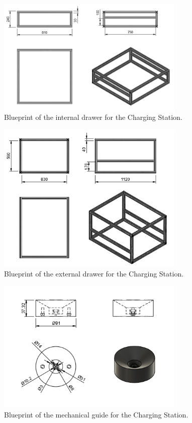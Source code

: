 

\begin{figure}[H]
    \centering
    \includegraphics[width=0.8\textwidth]{PLANOS/PLANOS_CAJON_INTERNO_1.png}
    \caption{Blueprint of the internal drawer for the Charging Station.}
    \label{fig:cajon_interno}
\end{figure}


\begin{figure}[H]
    \centering
    \includegraphics[width=0.8\textwidth]{PLANOS/PLANOS_CAJON_EXTERNO_1.png}
    \caption{Blueprint of the external drawer for the Charging Station.}
    \label{fig:cajon_externo}
\end{figure}


\begin{figure}[H]
    \centering
    \includegraphics[width=0.8\textwidth]{PLANOS/PLANO_GUIAS_MECANICAS.png}
    \caption{Blueprint of the mechanical guide for the Charging Station.}
    \label{fig:guias_mecanicas}
\end{figure}




